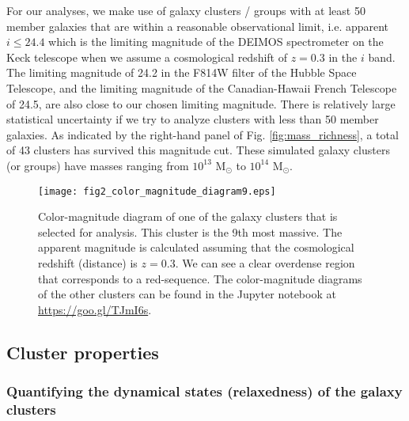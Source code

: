 For our analyses, we make use of galaxy clusters / groups 
with at least 50 member galaxies that are within a reasonable observational limit, 
i.e. apparent $i \leq 24.4$ which is the limiting magnitude of the DEIMOS
spectrometer on the Keck telescope when we assume a cosmological redshift of $z = 0.3$
in the $i$ band. The limiting magnitude of 24.2 in the
F814W filter of the Hubble Space Telescope, and the limiting magnitude of the
Canadian-Hawaii French Telescope of 24.5, 
are also close to our chosen limiting magnitude. 
There is relatively large statistical uncertainty if we try
to analyze clusters with less than 50 member galaxies. 
As indicated by the right-hand panel of Fig. \ref{fig:mass_richness}, 
a total of 43 clusters has 
survived this magnitude cut. These simulated galaxy clusters (or groups) have 
masses ranging from $10^{13}$ M$_\odot $ to $10^{14}$ M$_\odot$.  

\begin{figure}
	\centering
	\texttt{[image: fig2\_color\_magnitude\_diagram9.eps]}
	\caption{Color-magnitude diagram of one of the galaxy clusters that is selected for 
		analysis. This cluster is the 9th most massive. 
		The apparent magnitude is calculated assuming that 
		the cosmological redshift (distance) is $z = 0.3$. 
		We can see a clear overdense region that corresponds to a red-sequence.
		The color-magnitude diagrams of the other clusters can be found in the
		Jupyter notebook at \href{https://github.com/karenyyng/galaxy_DM_offset/blob/master/code/analyses/fig2_color_magnitude_diagram.ipynb}{https://goo.gl/TJmI6s}.
		\label{fig:color_magnitude_diagram}
	} 
\end{figure}

\subsection{Cluster properties}
\label{subsec:cluster_properties}

\subsubsection{Quantifying the dynamical states (relaxedness) of the galaxy clusters}
\label{subsubsec:relaxedness}

